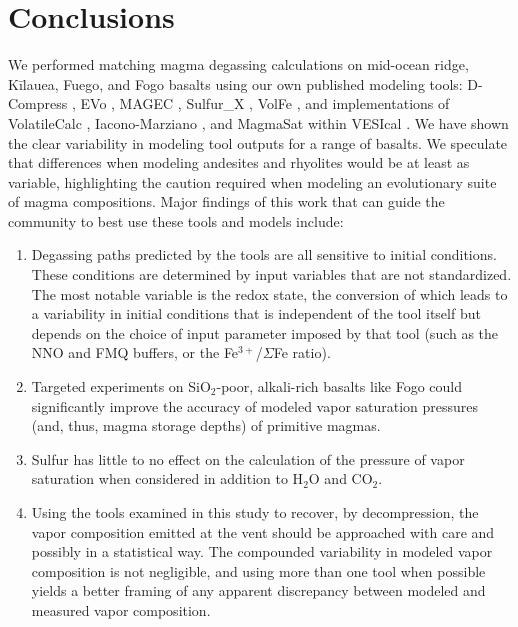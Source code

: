 \documentclass[draft, english]{volcanica-template}
\begin{document}
\section{Conclusions}
We performed matching magma degassing calculations on mid-ocean ridge, Kīlauea, Fuego, and Fogo basalts using our own published modeling tools: D-Compress \parencite{Burgisser2015}, EVo \parencite{Liggins2020,Liggins2022}, MAGEC \parencite{Sun2022,Sun2024}, Sulfur\_X \parencite{Ding2023}, VolFe \parencite{hughes2024modeling,Hughes2025volfe}, and implementations of VolatileCalc \parencite{Newman2002}, Iacono-Marziano \parencite{IaconoMarziano2012}, and MagmaSat \parencite{GhiorsoGualda2015} within VESIcal \parencite{Iacovino2021}. We have shown the clear variability in modeling tool outputs for a range of basalts. We speculate that differences when modeling andesites and rhyolites would be at least as variable, highlighting the caution required when modeling an evolutionary suite of magma compositions. Major findings of this work that can guide the community to best use these tools and models include:
\begin{enumerate}
    \item Degassing paths predicted by the tools are all sensitive to initial conditions. These conditions are determined by input variables that are not standardized. The most notable variable is the redox state, the conversion of which leads to a variability in initial conditions that is independent of the tool itself but depends on the choice of input parameter imposed by that tool (such as the NNO and FMQ buffers, or the Fe$^{3+}$/$\Sigma$Fe ratio).
    \item Targeted experiments on SiO$_2$-poor, alkali-rich basalts like Fogo could significantly improve the accuracy of modeled vapor saturation pressures (and, thus, magma storage depths) of primitive magmas.
    \item Sulfur has little to no effect on the calculation of the pressure of vapor saturation when considered in addition to H$_2$O and CO$_2$.
    \item Using the tools examined in this study to recover, by decompression, the vapor composition emitted at the vent should be approached with care and possibly in a statistical way. The compounded variability in modeled vapor composition is not negligible, and using more than one tool when possible yields a better framing of any apparent discrepancy between modeled and measured vapor composition.
\end{enumerate}
\end{document}
